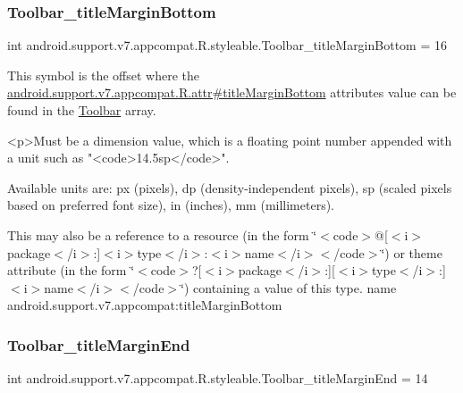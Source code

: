 \subsubsection{\texorpdfstring{Toolbar\+\_\+title\+Margin\+Bottom}{Toolbar\_titleMarginBottom}}
{\footnotesize\ttfamily int android.\+support.\+v7.\+appcompat.\+R.\+styleable.\+Toolbar\+\_\+title\+Margin\+Bottom = 16\hspace{0.3cm}{\ttfamily [static]}}

This symbol is the offset where the \hyperlink{classandroid_1_1support_1_1v7_1_1appcompat_1_1R_1_1attr_a04440642e436aae11b89705695772631}{android.\+support.\+v7.\+appcompat.\+R.\+attr\#title\+Margin\+Bottom} attribute\textquotesingle{}s value can be found in the \hyperlink{classandroid_1_1support_1_1v7_1_1appcompat_1_1R_1_1styleable_a2daba9587ef9f700f2d54cf13435cb32}{Toolbar} array.

\begin{DoxyVerb}      <p>Must be a dimension value, which is a floating point number appended with a unit such as "<code>14.5sp</code>".
\end{DoxyVerb}
 Available units are\+: px (pixels), dp (density-\/independent pixels), sp (scaled pixels based on preferred font size), in (inches), mm (millimeters). 

This may also be a reference to a resource (in the form \char`\"{}$<$code$>$@\mbox{[}$<$i$>$package$<$/i$>$\+:\mbox{]}$<$i$>$type$<$/i$>$\+:$<$i$>$name$<$/i$>$$<$/code$>$\char`\"{}) or theme attribute (in the form \char`\"{}$<$code$>$?\mbox{[}$<$i$>$package$<$/i$>$\+:\mbox{]}\mbox{[}$<$i$>$type$<$/i$>$\+:\mbox{]}$<$i$>$name$<$/i$>$$<$/code$>$\char`\"{}) containing a value of this type.  name android.\+support.\+v7.\+appcompat\+:title\+Margin\+Bottom \mbox{\label{classandroid_1_1support_1_1v7_1_1appcompat_1_1R_1_1styleable_a141a5fe7ad67958248bcacd6a5f7043d}} 
\subsubsection{\texorpdfstring{Toolbar\+\_\+title\+Margin\+End}{Toolbar\_titleMarginEnd}}
{\footnotesize\ttfamily int android.\+support.\+v7.\+appcompat.\+R.\+styleable.\+Toolbar\+\_\+title\+Margin\+End = 14\hspace{0.3cm}{\ttfamily [static]}}

